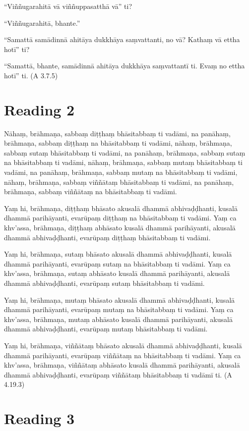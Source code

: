 “Viññugarahitā vā viññuppasatthā vā” ti?

“Viññugarahitā, bhante.”

“Samattā samādinnā ahitāya dukkhāya saṃvattanti, no vā? Kathaṃ vā ettha hotī” ti?

“Samattā, bhante, samādinnā ahitāya dukkhāya saṃvattantī ti. Evaṃ no ettha hotī” ti. \hfill(A 3.7.5)

\section*{Reading 2}

Nāhaṃ, brāhmaṇa, sabbaṃ diṭṭhaṃ bhāsitabbaṃ ti vadāmi, na panāhaṃ, brāhmaṇa, sabbaṃ diṭṭhaṃ na bhāsitabbaṃ ti vadāmi, nāhaṃ, brāhmaṇa, sabbaṃ sutaṃ bhāsitabbaṃ ti vadāmi, na panāhaṃ, brāhmaṇa, sabbaṃ sutaṃ na bhāsitabbaṃ ti vadāmi, nāhaṃ, brāhmaṇa, sabbaṃ mutaṃ bhāsitabbaṃ ti vadāmi, na panāhaṃ, brāhmaṇa, sabbaṃ mutaṃ na bhāsitabbaṃ ti vadāmi, nāhaṃ, brāhmaṇa, sabbaṃ viññātaṃ bhāsitabbaṃ ti vadāmi, na panāhaṃ, brāhmaṇa, sabbaṃ viññātaṃ na bhāsitabbaṃ ti vadāmi.

Yaṃ hi, brāhmaṇa, diṭṭhaṃ bhāsato akusalā dhammā abhivaḍḍhanti, kusalā dhammā parihāyanti, evarūpaṃ diṭṭhaṃ na bhāsitabbaṃ ti vadāmi. Yaṃ ca khv’assa, brāhmaṇa, diṭṭhaṃ abhāsato kusalā dhammā parihāyanti, akusalā dhammā abhivaḍḍhanti, evarūpaṃ diṭṭhaṃ bhāsitabbaṃ ti vadāmi.

Yaṃ hi, brāhmaṇa, sutaṃ bhāsato akusalā dhammā abhivaḍḍhanti, kusalā dhammā parihāyanti, evarūpaṃ sutaṃ na bhāsitabbaṃ ti vadāmi. Yaṃ ca khv’assa, brāhmaṇa, sutaṃ abhāsato kusalā dhammā parihāyanti, akusalā dhammā abhivaḍḍhanti, evarūpaṃ sutaṃ bhāsitabbaṃ ti vadāmi.

Yaṃ hi, brāhmaṇa, mutaṃ bhāsato akusalā dhammā abhivaḍḍhanti, kusalā dhammā parihāyanti, evarūpaṃ mutaṃ na bhāsitabbaṃ ti vadāmi. Yaṃ ca khv’assa, brāhmaṇa, mutaṃ abhāsato kusalā dhammā parihāyanti, akusalā dhammā abhivaḍḍhanti, evarūpaṃ mutaṃ bhāsitabbaṃ ti vadāmi.

Yaṃ hi, brāhmaṇa, viññātaṃ bhāsato akusalā dhammā abhivaḍḍhanti, kusalā dhammā parihāyanti, evarūpaṃ viññātaṃ na bhāsitabbaṃ ti vadāmi. Yaṃ ca khv’assa, brāhmaṇa, viññātaṃ abhāsato kusalā dhammā parihāyanti, akusalā dhammā abhivaḍḍhanti, evarūpaṃ viññātaṃ bhāsitabbaṃ ti vadāmī ti. \hfill(A 4.19.3)

\section*{Reading 3}

